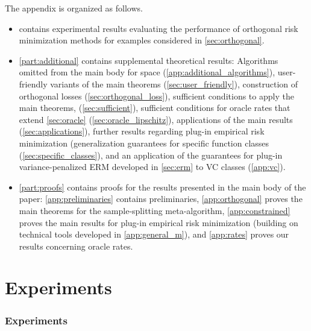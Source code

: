 \documentclass[11pt]{article} %
\newcommand{\journal}[1]{\iftoggle{journal}{#1}{}}
\newcommand{\preprint}[1]{\iftoggle{journal}{}{#1}}
\newcommand{\pref}[1]{\cref{#1}}
\theoremstyle{theorem}  %
\theoremstyle{plain}
\begin{document}
\preprint{\section*{Organization of Appendix}}
\journal{\section*{Organization}}
The appendix is organized as
follows.
\begin{itemize}
\item \pref{part:experiments} contains experimental results evaluating
  the performance of orthogonal risk minimization methods for examples
  considered in \pref{sec:orthogonal}.
  \item \pref{part:additional} contains supplemental theoretical results: Algorithms
  omitted from the main body for space
  (\pref{app:additional_algorithms}), user-friendly variants of the
  main theorems (\pref{sec:user_friendly}), construction of
  orthogonal losses (\pref{sec:orthogonal_loss}), sufficient
  conditions to apply the main theorems,
  (\pref{sec:sufficient}), sufficient conditions for oracle rates that
  extend \pref{sec:oracle} (\pref{sec:oracle_lipschitz}), applications
  of the main results (\pref{sec:applications}), further results
  regarding plug-in empirical risk minimization (generalization
  guarantees for specific function classes
  (\pref{sec:specific_classes}), and an application of the guarantees
  for plug-in variance-penalized ERM developed in \pref{sec:erm} to VC
  classes (\pref{app:vc}).
\item   \pref{part:proofs} contains proofs for the results presented in the
  main body of the paper: \pref{app:preliminaries} contains
  preliminaries, \pref{app:orthogonal} proves the main theorems for
  the sample-splitting meta-algorithm, \pref{app:constrained} proves
  the main results for plug-in empirical risk minimization (building
  on technical tools developed in \pref{app:general_m}), and
  \pref{app:rates} proves our results concerning oracle rates.
\end{itemize}


%

%

\part{Experiments}
\label{part:experiments}
\section{Experiments}
%
\newcommand{\E}{\mathbb{E}}
\end{document}
